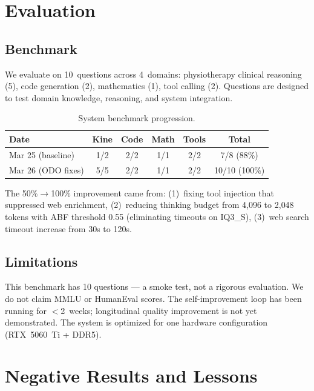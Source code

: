 \documentclass[10pt,a4paper]{article}
\begin{document}
\section{Evaluation}

\subsection{Benchmark}

We evaluate on 10~questions across 4~domains: physiotherapy clinical reasoning (5), code generation (2), mathematics (1), tool calling (2). Questions are designed to test domain knowledge, reasoning, and system integration.

\begin{table}[h]
\centering
\caption{System benchmark progression.}
\begin{tabular}{lccccc}
\toprule
\textbf{Date} & \textbf{Kine} & \textbf{Code} & \textbf{Math} & \textbf{Tools} & \textbf{Total} \\
\midrule
Mar 25 (baseline) & 1/2 & 2/2 & 1/1 & 2/2 & 7/8 (88\%) \\
Mar 26 (ODO fixes) & 5/5 & 2/2 & 1/1 & 2/2 & 10/10 (100\%) \\
\bottomrule
\end{tabular}
\end{table}

The 50\%$\to$100\% improvement came from: (1)~fixing tool injection that suppressed web enrichment, (2)~reducing thinking budget from 4{,}096 to 2{,}048 tokens with ABF threshold 0.55 (eliminating timeouts on IQ3\_S), (3)~web search timeout increase from 30s to 120s.

\subsection{Limitations}

This benchmark has 10 questions --- a smoke test, not a rigorous evaluation. We do not claim MMLU or HumanEval scores. The self-improvement loop has been running for $<$2~weeks; longitudinal quality improvement is not yet demonstrated. The system is optimized for one hardware configuration (RTX~5060~Ti + DDR5).

\section{Negative Results and Lessons}
\end{document}
